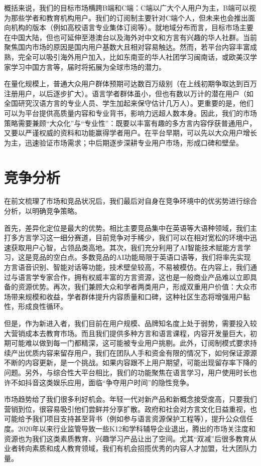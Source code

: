概括来说，我们的目标市场横跨B端和C端：C端以广大个人用户为主，B端可以视为那些学者和教育机构用户。我们的订阅制主要针对C端个人，但未来也会推出面向机构的版本（例如高校语言专业集体订阅等）。就地域分布而言，目标市场主要在中国大陆，但也可延伸至港澳台以及海外对中文和方言有兴趣的华人社群。当前聚焦国内市场的原因是国内用户基数大且相对容易触达。然而，若平台内容丰富成熟，完全可以吸引海外用户加入，比如东南亚的华人社团学习闽南话，或欧美汉学家学习中国方言等，届时将拓展为全球市场的潜力。

在量化规模上，普通大众用户群体预期可达数百万级别（在上线初期争取达到百万注册用户，以后逐步扩大）。语言学者群体虽小，但也有数以万计的潜在用户（如全国研究汉语方言的专业人员、学生加起来保守估计几万人）。更重要的是，他们可以为平台提供高质量内容和专业背书，影响力远超人数本身。因此，我们的市场策略需要兼顾“大众化”与“专业性”：既要以丰富有趣的多方言内容俘获普通用户，又要以严谨权威的资料和功能赢得学者用户。在平台早期，可以先以大众用户增长为主，迅速验证市场需求；中后期逐步深耕专业用户市场，形成口碑和壁垒。
\section{竞争分析}
在前文梳理了市场和竞品状况后，我们最后对自身在竞争环境中的优劣势进行综合分析，以明确竞争策略。

首先，差异化定位是最大的优势。相比主要竞品集中在英语等大语种领域，我们主打多方言学习这一细分赛道，目前竞争对手稀少，我们可以在相对宽松的环境中迅速获取用户心智，占领品类高地。其次，我们充分利用了AI智能技术赋能方言学习，这是竞品的空白点。多数竞品的AI功能局限于英语口语等，我们将率先实现方言语音识别、智能对话等功能，技术壁垒较高，不易被模仿。在内容上，我们通过与语言学专家合作，拥有权威丰富的方言资源，这也是一般商业产品难以立即具备的资源优势。再次，我们兼顾大众和学者两类用户，形成双重用户价值：大众市场带来规模和收益，学者群体提升内容质量和口碑，这种社区生态将增强用户黏性，形成良性循环。

但是，作为新进入者，我们目前在用户规模、品牌知名度上处于弱势，需要投入较大营销成本去教育市场。而且我们提供多种方言和语言课程，内容开发量巨大，初期可能难以做到每一门都精深，这可能被专业用户挑剔。此外，订阅制模式要求持续产出优质内容来留存用户，我们在团队人手和资金有限的情况下，如何保证源源不断的内容更新，是一个挑战。如果内容跟不上用户期望，可能出现留存率下降的问题。另外，与综合性大平台相比，我们的功能聚焦在语言学习，用户使用时长也许不如抖音这类娱乐应用，面临“争夺用户时间”的隐性竞争。

市场趋势给了我们很多利好机会。年轻一代对新产品和新概念接受度高，只要我们营销到位，很容易吸引他们尝鲜并分享扩散。政府和社会对方言文化日益重视，也可能给予我们项目支持甚至背书（例如参与语言资源保护工程等），提升公众信任度。2020年以来行业监管导致一些K12和学科辅导企业退出，腾出的市场关注度和资源也为我们这类素质教育、兴趣学习产品让出了空间。尤其“双减”后很多教育从业者转向素质和成人教育领域，我们有机会招揽优秀的内容人才加盟，壮大团队力量。


